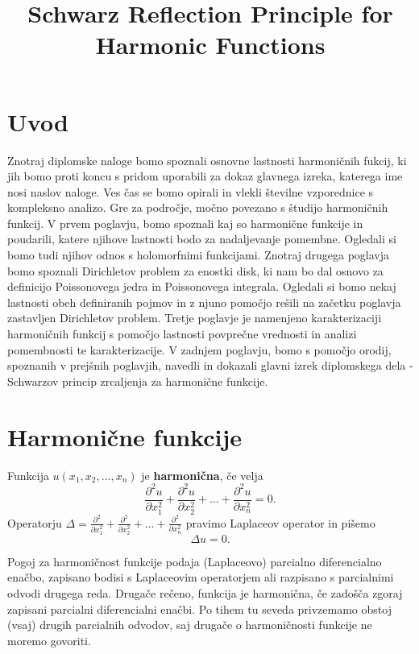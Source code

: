 \documentclass[mat1]{fmfdelo}
\title{Schwarz Reflection Principle for Harmonic Functions}
\begin{document}
\section{Uvod}
Znotraj diplomske naloge bomo spoznali osnovne lastnosti harmoničnih fukcij, ki jih bomo proti koncu s pridom uporabili za dokaz glavnega izreka, katerega ime nosi naslov naloge.
Ves čas se bomo opirali in vlekli številne vzporednice s kompleksno analizo. Gre za področje, močno povezano s študijo harmoničnih funkcij.
\newline
V prvem poglavju, bomo spoznali kaj so harmonične funkcije in poudarili, katere njihove lastnosti bodo za nadaljevanje pomembne. Ogledali si bomo tudi njihov odnos s holomorfnimi funkcijami. 
Znotraj drugega poglavja bomo spoznali Dirichletov problem za enostki disk, ki nam bo dal osnovo za definicijo Poissonovega jedra in Poissonovega integrala. Ogledali si bomo nekaj lastnosti obeh definiranih pojmov in z njuno pomočjo rešili na začetku poglavja zastavljen Dirichletov problem.
Tretje poglavje je namenjeno karakterizaciji harmoničnih funkcij s pomočjo lastnosti povprečne vrednosti in analizi pomembnosti te karakterizacije. 
V zadnjem poglavju, bomo s pomočjo orodij, spoznanih v prejšnih poglavjih, navedli in dokazali glavni izrek diplomskega dela - Schwarzov princip zrcaljenja za harmonične funkcije.
%

\section{Harmonične funkcije}
    \begin{definicija}
        \label{harm}
        Funkcija $u(x_1, x_2, \dots, x_n)$ je \textbf{harmonična}, če velja
        $$
        \frac{\partial^2 u}{\partial x_1 ^ 2} +  \frac{\partial^2 u}{\partial x_2 ^ 2} + \dots + \frac{\partial^2 u}{\partial x_n ^ 2} = 0.
        $$
        Operatorju $\Delta  = \frac{\partial^2}{\partial x_1 ^ 2} +  \frac{\partial^2}{\partial x_2 ^ 2} + \dots + \frac{\partial^2}{\partial x_n ^ 2}$ pravimo Laplaceov operator in pišemo
        $$
        \Delta u = 0.
        $$
    \end{definicija}

    Pogoj za harmoničnost funkcije podaja (Laplaceovo) parcialno diferencialno enačbo, zapisano bodisi s Laplaceovim operatorjem ali razpisano s parcialnimi odvodi drugega reda. 
    Drugače rečeno, funkcija je harmonična, če zadošča zgoraj zapisani parcialni diferencialni enačbi. 
    Po tihem tu seveda privzemamo obstoj (vsaj) drugih parcialnih odvodov, saj drugače o harmoničnosti funkcije ne moremo govoriti.
\end{document}
